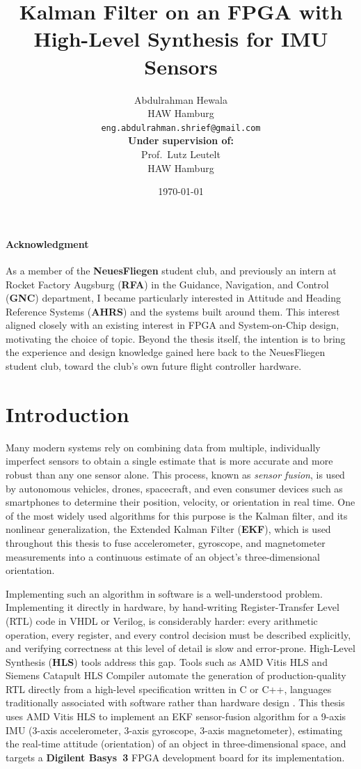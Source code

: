 \documentclass[12pt,a4paper]{article}
\title{
  \textbf{Kalman Filter on an FPGA with High-Level Synthesis for IMU Sensors}\\[0.5em]
}
\author{
  Abdulrahman Hewala\\
  HAW Hamburg\\
  \texttt{eng.abdulrahman.shrief@gmail.com}
  \\[2em]
  \textbf{Under supervision of:}\\
  Prof.\ Lutz Leutelt\\
  HAW Hamburg
}
\date{\today}
\begin{document}
\maketitle
\newpage
\tableofcontents
\newpage


\paragraph{Acknowledgment} As a member of the
\textbf{NeuesFliegen} student club, and previously an intern at
Rocket Factory Augsburg (\textbf{RFA}) in the Guidance, Navigation,
and Control (\textbf{GNC}) department, I became particularly
interested in Attitude and Heading Reference Systems
(\textbf{AHRS}) and the systems built around them. This interest
aligned closely with an existing interest in FPGA and
System-on-Chip design, motivating the choice of topic. Beyond the
thesis itself, the intention is to bring the experience and design
knowledge gained here back to the NeuesFliegen student club, toward
the club's own future flight controller hardware. 
\newpage


\section{Introduction}
\label{sec:introduction}

Many modern systems rely on combining data from multiple,
individually imperfect sensors to obtain a single estimate that is
more accurate and more robust than any one sensor alone. This
process, known as \textit{sensor fusion}, is used by autonomous
vehicles, drones, spacecraft, and even consumer devices such as
smartphones to determine their position, velocity, or orientation
in real time. One of the most widely used algorithms for this
purpose is the Kalman filter, and its nonlinear generalization, the
Extended Kalman Filter (\textbf{EKF}), which is used throughout this
thesis to fuse accelerometer, gyroscope, and magnetometer
measurements into a continuous estimate of an object's
three-dimensional orientation.

Implementing such an algorithm in software is a well-understood
problem. Implementing it directly in hardware, by hand-writing
Register-Transfer Level (RTL) code in VHDL or Verilog, is
considerably harder: every arithmetic operation, every register, and
every control decision must be described explicitly, and verifying
correctness at this level of detail is slow and error-prone.
High-Level Synthesis (\textbf{HLS}) tools address this gap. Tools
such as AMD Vitis HLS and Siemens Catapult HLS
Compiler automate the generation of production-quality RTL directly
from a high-level specification written in C or C++, languages
traditionally associated with software rather than hardware design
\cite{hls_academy_101}.  This thesis uses AMD Vitis
HLS to implement an EKF sensor-fusion algorithm for a 9-axis IMU
(3-axis accelerometer, 3-axis gyroscope, 3-axis magnetometer),
estimating the real-time attitude (orientation) of an object in
three-dimensional space, and targets a \textbf{Digilent Basys~3} FPGA
development board for its implementation.
\end{document}
